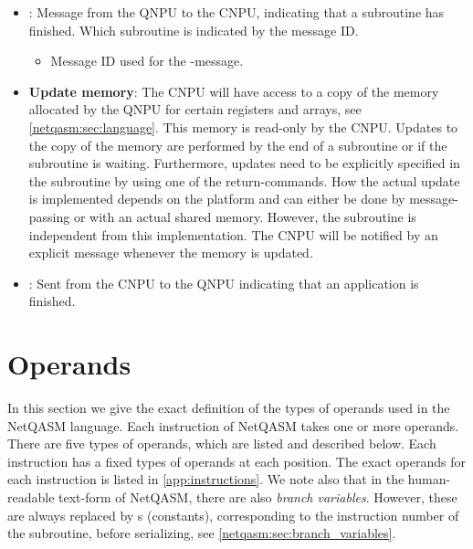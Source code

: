 \begin{itemize}
\begin{itemize}
        \end{itemize}
  \item {}:
        Message from the \ac{QNPU} to the \ac{CNPU}, indicating that a subroutine has finished.
        Which subroutine is indicated by the message ID.
        \begin{itemize}
            \item {} Message ID used for the -message.
        \end{itemize}
  \item \textbf{Update memory}:
        The \ac{CNPU} will have access to a copy of the memory allocated by the \ac{QNPU} for certain registers and arrays, see \cref{netqasm:sec:language}.
        This memory is read-only by the \ac{CNPU}.
        Updates to the copy of the memory are performed by the end of a subroutine or if the subroutine is waiting.
        Furthermore, updates need to be explicitly specified in the subroutine by using one of the return-commands.
        How the actual update is implemented depends on the platform and can either be done by message-passing or with an actual shared memory.
        However, the subroutine is independent from this implementation.
        The \ac{CNPU} will be notified by an explicit message whenever the memory is updated.
  \item {}:
        Sent from the \ac{CNPU} to the \ac{QNPU} indicating that an application is finished.
\end{itemize}


\section{Operands}
\label{netqasm:sec:operands}
In this section we give the exact definition of the types of operands used in the \ac{NetQASM} language.
Each instruction of \ac{NetQASM} takes one or more operands.
There are five types of operands, which are listed and described below.
Each instruction has a fixed types of operands at each position.
The exact operands for each instruction is listed in \cref{app:instructions}.
We note also that in the human-readable text-form of \ac{NetQASM}, there are also \textit{branch variables}.
However, these are always replaced by \IMMEDIATE{}s (constants), corresponding to the instruction number of the subroutine, before serializing, see \cref{netqasm:sec:branch_variables}.

